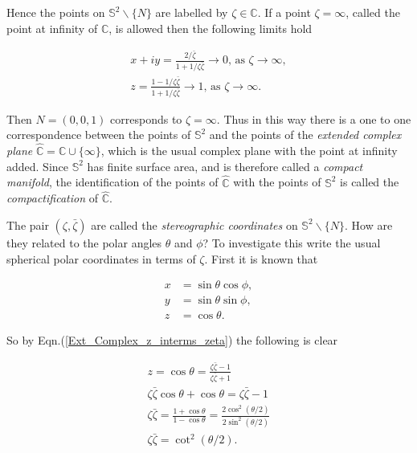 \noindent Hence the points on $\mathbb{S}^2 \backslash \{N\}$ are labelled by $\zeta \in \mathbb{C}$. If a point $\zeta = \infty$, called the point at infinity of $\mathbb{C}$, is allowed then the following limits hold

\begin{eqnarray*}
x+ iy = \frac{2/\bar{\zeta}}{1 + 1/\zeta\bar{\zeta}} \rightarrow 0 \text{, as  } \zeta \rightarrow \infty, \\
z = \frac{1- 1/\zeta\bar{\zeta}}{1+ 1/\zeta\bar{\zeta}} \rightarrow 1 \text{, as  } \zeta \rightarrow \infty. 
\end{eqnarray*}

\noindent Then $N = (0,0,1)$ corresponds to $\zeta = \infty$. Thus in this way there is a one to one correspondence between the points of $\mathbb{S}^2$ and the points of the \textit{extended complex plane} $\hat{\mathbb{C}} = \mathbb{C} \cup \{ \infty \}$, which is the usual complex plane with the point at infinity added. Since $\mathbb{S}^2$ has finite surface area, and is therefore called a \textit{compact manifold}, the identification of the points of $\hat{\mathbb{C}}$ with the points of $\mathbb{S}^2$ is called the \textit{compactification} of $\hat{\mathbb{C}}$.

The pair $(\zeta, \bar{\zeta})$ are called the \textit{stereographic coordinates} on $\mathbb{S}^2 \backslash \{N\}$. How are they related to the polar angles $\theta$ and $\phi$? To investigate this write the usual spherical polar coordinates in terms of $\zeta$. First it is known that

\begin{align*}
x & = \sin{\theta}\cos{\phi}, \\
y & = \sin{\theta}\sin{\phi}, \\
z & = \cos{\theta}.
\end{align*}

\noindent So by Eqn.(\ref{Ext_Complex_z_interms_zeta}) the following is clear

\begin{gather*}
z = \cos{\theta} = \frac{\zeta\bar{\zeta} - 1}{\zeta\bar{\zeta} + 1} \\
\zeta\bar{\zeta}\cos{\theta} + \cos{\theta} = \zeta\bar{\zeta} - 1\\
\zeta\bar{\zeta} = \frac{1 + \cos{\theta}}{1 - \cos{\theta}} = \frac{2\cos^2{\left(\theta/2\right)}}{2\sin^2{\left(\theta/2\right)}} \\
\zeta\bar{\zeta} = \cot^2{\left(\theta/2\right)}.
\end{gather*}

